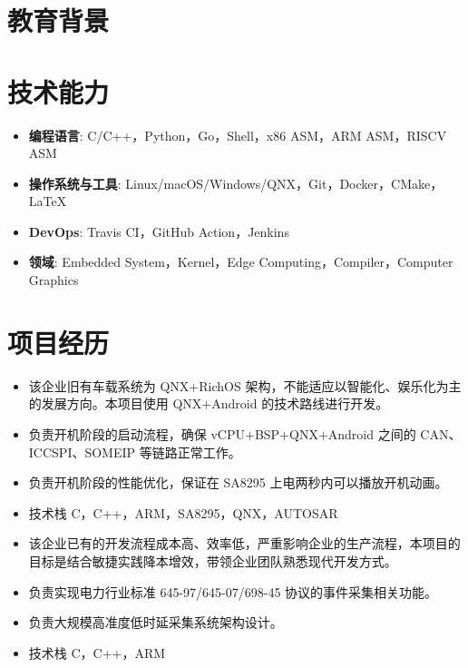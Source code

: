 \documentclass{resume}
\begin{document}
\lastupdated


\section{教育背景}

\section{技术能力}
\begin{itemize}[parsep=0.2ex]
  \item \textbf{编程语言}: C/C++，Python，Go，Shell，x86 ASM，ARM ASM，RISCV ASM
  \item \textbf{操作系统与工具}: Linux/macOS/Windows/QNX，Git，Docker，CMake，\LaTeX
  \item \textbf{DevOps}: Travis CI，GitHub Action，Jenkins
  \item \textbf{领域}: Embedded System，Kernel，Edge Computing，Compiler，Computer Graphics
\end{itemize}

\section{项目经历}
\begin{itemize}
  \item 该企业旧有车载系统为 QNX+RichOS 架构，不能适应以智能化、娱乐化为主的发展方向。本项目使用 QNX+Android 的技术路线进行开发。
  \item 负责开机阶段的启动流程，确保 vCPU+BSP+QNX+Android 之间的 CAN、ICCSPI、SOMEIP 等链路正常工作。
  \item 负责开机阶段的性能优化，保证在 SA8295 上电两秒内可以播放开机动画。
  \item 技术栈 C，C++，ARM，SA8295，QNX，AUTOSAR
\end{itemize}

\begin{itemize}
  \item 该企业已有的开发流程成本高、效率低，严重影响企业的生产流程，本项目的目标是结合敏捷实践降本增效，带领企业团队熟悉现代开发方式。
  \item 负责实现电力行业标准 645-97/645-07/698-45 协议的事件采集相关功能。
  \item 负责大规模高准度低时延采集系统架构设计。
  \item 技术栈 C，C++，ARM
\end{itemize}
\end{document}
